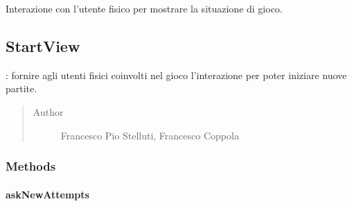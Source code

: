 \documentclass[letterpaper,10pt,italian,openany,oneside]{sphinxmanual}
\begin{document}
\begin{fulllineitems}
\label{\detokenize{source/it/unicam/cs/pa/mastermind/ui/GameView:it.unicam.cs.pa.mastermind.ui.GameView.showGame()}}
Interazione con l’utente fisico per mostrare la situazione di gioco.

\end{fulllineitems}



\subsection{StartView}
\label{\detokenize{source/it/unicam/cs/pa/mastermind/ui/StartView:startview}}\label{\detokenize{source/it/unicam/cs/pa/mastermind/ui/StartView::doc}}

\begin{fulllineitems}
\label{\detokenize{source/it/unicam/cs/pa/mastermind/ui/StartView:it.unicam.cs.pa.mastermind.ui.StartView}}
: fornire agli utenti fisici coinvolti nel gioco l’interazione per poter iniziare nuove partite.
\begin{quote}\begin{description}
\item[{Author}] \leavevmode
Francesco Pio Stelluti, Francesco Coppola

\end{description}\end{quote}

\end{fulllineitems}



\subsubsection{Methods}
\label{\detokenize{source/it/unicam/cs/pa/mastermind/ui/StartView:methods}}

\paragraph{askNewAttempts}
\label{\detokenize{source/it/unicam/cs/pa/mastermind/ui/StartView:asknewattempts}}
\end{document}
